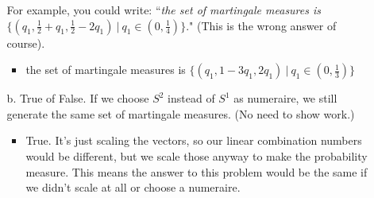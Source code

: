 \documentclass[12pt]{article}
\newcommand{\ol}{\overline}
\begin{document}
\begin{enumerate}
\begin{itemize}
  For example, you could write: ``\textit{the set of martingale measures is} $\{(q_1, \frac{1}{2} + q_1, \frac{1}{2} - 2 q_1)\ \vert\ q_1 \in (0, \frac{1}{4})\}$." (This is the wrong answer of course).

\begin{itemize}
    \item the set of martingale measures is $\{(q_1, 1-  3q_1, 2q_1)\ \vert\ q_1 \in (0, \frac{1}{3})\}$
\end{itemize}

\begin{comment}  
  \textit{Solution}: The normalized market is
  \begin{align*}
  \ol{Z} = \begin{bmatrix}
  1	& 1	& 1	& 1\\
  2	& 4	& 2	& 1
  \end{bmatrix}
  \end{align*}
  Let $(q_1, q_2, q_3)$ be a martingale measure. The conditions on the $q$'s are: $q_i \in (0, 1)$ for all $i$, $1 = q_1 + q_2 + q_3$, and $2 = 4 q_1 + 2 q_2 + q_3$.
  
  This yields the condition $1 = 3 q_1 + q_2$ or, equivalently, $q_2 = 1 - 3 q_1$. Thus, the set of martingale measures is $\{(q_1, 1 - 3 q_1, 2 q_1)\ \vert\ q_1 \in (0, \frac{1}{3})\}$.
\end{comment}
  
  \item[b.] True of False. If we choose $S^2$ instead of $S^1$ as numeraire, we still generate the same set of martingale measures. (No need to show work.)
  \begin{itemize}
      \item True. It's just scaling the vectors, so our linear combination numbers would be different, but we scale those anyway to make the probability measure. This means the answer to this problem would be the same if we didn't scale at all or choose a numeraire.
  \end{itemize}
  
\begin{comment}
  \textit{Solution}: False. The normalized market with $S^2$ as numeraire is
  \begin{align*}
  \ol{Z} = \begin{bmatrix}
  \frac{1}{2}	& \frac{1}{4}	& \frac{1}{2}	& 1\\
  1			& 1			& 1			& 1
  \end{bmatrix}
  \end{align*}
  The probability $(\frac{1}{4}, \frac{1}{4}, \frac{1}{2})$ is a martingale measure when $S^1$ is numeraire, but not when $S^2$ is numeraire.
\end{comment}


\end{itemize}
\end{enumerate}
\end{document}
